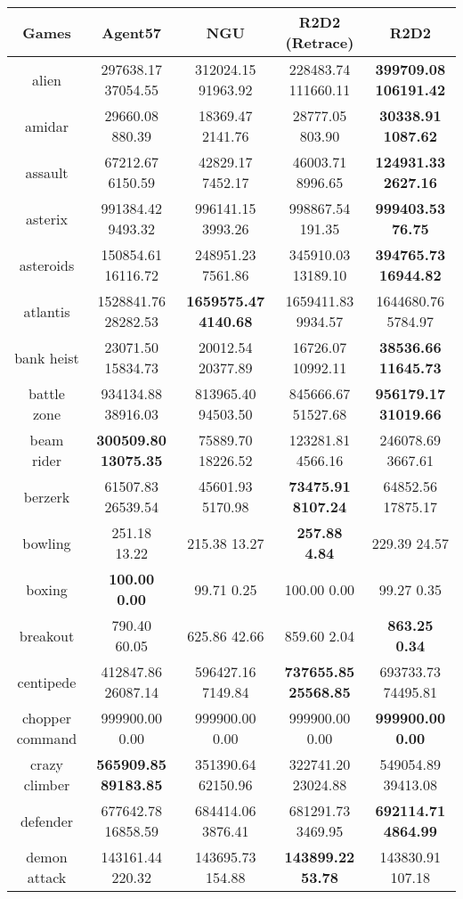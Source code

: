 \documentclass{article}
\begin{document}
\begin{tabular}{|c|c|c|c|c|}
\hline
 Games & Agent57 & NGU & R2D2 (Retrace) & R2D2 \\
\hline
 alien & 297638.17  37054.55 & 312024.15  91963.92 & 228483.74  111660.11 & \bf{399709.08  106191.42} \\
 amidar & 29660.08  880.39 & 18369.47  2141.76 & 28777.05  803.90 & \bf{30338.91  1087.62} \\
 assault & 67212.67  6150.59 & 42829.17  7452.17 & 46003.71  8996.65 & \bf{124931.33  2627.16} \\
 asterix & 991384.42  9493.32 & 996141.15  3993.26 & 998867.54  191.35 & \bf{999403.53  76.75} \\
 asteroids & 150854.61  16116.72 & 248951.23  7561.86 & 345910.03  13189.10 & \bf{394765.73  16944.82} \\
 atlantis & 1528841.76  28282.53 & \bf{1659575.47  4140.68} & 1659411.83  9934.57 & 1644680.76  5784.97 \\
 bank heist & 23071.50  15834.73 & 20012.54  20377.89 & 16726.07  10992.11 & \bf{38536.66  11645.73} \\
 battle zone & 934134.88  38916.03 & 813965.40  94503.50 & 845666.67  51527.68 & \bf{956179.17  31019.66} \\
 beam rider & \bf{300509.80  13075.35} & 75889.70  18226.52 & 123281.81  4566.16 & 246078.69  3667.61 \\
 berzerk & 61507.83  26539.54 & 45601.93  5170.98 & \bf{73475.91  8107.24} & 64852.56  17875.17 \\
 bowling & 251.18  13.22 & 215.38  13.27 & \bf{257.88  4.84} & 229.39  24.57 \\
 boxing & \bf{100.00  0.00} & 99.71  0.25 & 100.00  0.00 & 99.27  0.35 \\
 breakout & 790.40  60.05 & 625.86  42.66 & 859.60  2.04 & \bf{863.25  0.34} \\
 centipede & 412847.86  26087.14 & 596427.16  7149.84 & \bf{737655.85  25568.85} & 693733.73  74495.81 \\
 chopper command & 999900.00  0.00 & 999900.00  0.00 & 999900.00  0.00 & \bf{999900.00  0.00} \\
 crazy climber & \bf{565909.85  89183.85} & 351390.64  62150.96 & 322741.20  23024.88 & 549054.89  39413.08 \\
 defender & 677642.78  16858.59 & 684414.06  3876.41 & 681291.73  3469.95 & \bf{692114.71  4864.99} \\
 demon attack & 143161.44  220.32 & 143695.73  154.88 & \bf{143899.22  53.78} & 143830.91  107.18 \\

\end{tabular}
\end{document}
